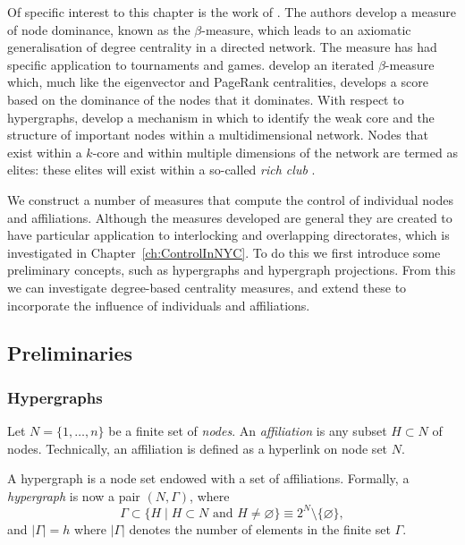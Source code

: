 Of specific interest to this chapter is the work of \citet{BrinkGilles1996, BrinkGilles2000}. The authors develop a measure of node dominance, known as the $\beta$-measure, which leads to an axiomatic generalisation of degree centrality in a directed network. The measure has had specific application to tournaments and games. \citet{BormBrink2002} develop an iterated $\beta$-measure which, much like the eigenvector and PageRank centralities, develops a score based on the dominance of the nodes that it dominates. With respect to hypergraphs, \citet{Corominas-MurtraThurner2014} develop a mechanism in which to identify the weak core and the structure of important nodes within a multidimensional network. Nodes that exist within a $k$-core and within multiple dimensions of the network are termed as elites: these elites will exist within a so-called \emph{rich club} \citep{Colizza2006}.

We construct a number of measures that compute the control of individual nodes and affiliations. Although the measures developed are general they are created to have particular application to interlocking and overlapping directorates, which is investigated in Chapter~\ref{ch:ControlInNYC}. To do this we first introduce some preliminary concepts, such as hypergraphs and hypergraph projections. From this we can investigate degree-based centrality measures, and extend these to incorporate the influence of individuals and affiliations.

\subsection{Preliminaries}

\subsubsection*{Hypergraphs}

Let $N = \{ 1, \ldots ,n \}$ be a finite set of \emph{nodes}. An \emph{affiliation} is any subset $H \subset N$ of nodes. Technically, an affiliation is defined as a hyperlink on node set $N$.

A hypergraph is a node set endowed with a set of affiliations. Formally, a \emph{hypergraph} is now a pair $(N, \Gamma )$, where
\begin{equation}
\Gamma \subset \{ H \mid H \subset N \mbox{ and } H \neq \varnothing \} \equiv 2^N \setminus \{\varnothing\} ,
\end{equation}
and $| \Gamma | = h$ where $| \Gamma |$ denotes the number of elements in the finite set $\Gamma$.

